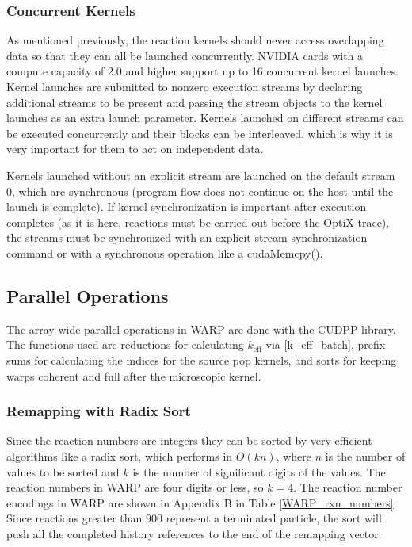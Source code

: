 \subsubsection{Concurrent Kernels}

As mentioned previously, the reaction kernels should never access overlapping data so that they can all be launched concurrently.  NVIDIA cards with a compute capacity of 2.0 and higher support up to 16 concurrent kernel launches.  Kernel launches are submitted to nonzero execution streams by declaring additional streams to be present and passing the stream objects to the kernel launches as an extra launch parameter.  Kernels launched on different streams can be executed concurrently and their blocks can be interleaved, which is why it is very important for them to act on independent data. %

Kernels launched without an explicit stream are launched on the default stream 0, which are synchronous (program flow does not continue on the host until the launch is complete).  If kernel synchronization is important after execution completes (as it is here, reactions must be carried out before the OptiX trace), the streams must be synchronized with an explicit stream synchronization command or with a synchronous operation like a cudaMemcpy().%

\subsection{Parallel Operations}

The array-wide parallel operations in WARP are done with the CUDPP library.  The functions used are reductions for calculating $k_\mathrm{eff}$ via \eqref{k_eff_batch}, prefix sums for calculating the indices for the source pop kernels, and sorts for keeping warps coherent and full after the microscopic kernel.

\subsubsection{Remapping with Radix Sort}

Since the reaction numbers are integers they can be sorted by very efficient algorithms like a radix sort, which performs in $O(kn)$, where $n$ is the number of values to be sorted and $k$ is the number of significant digits of the values.  The reaction numbers in WARP are four digits or less, so $k=4$.  The reaction number encodings in WARP are shown in Appendix B in Table \ref{WARP_rxn_numbers}.  Since reactions greater than 900 represent a terminated particle, the sort will push all the completed history references to the end of the remapping vector.  

